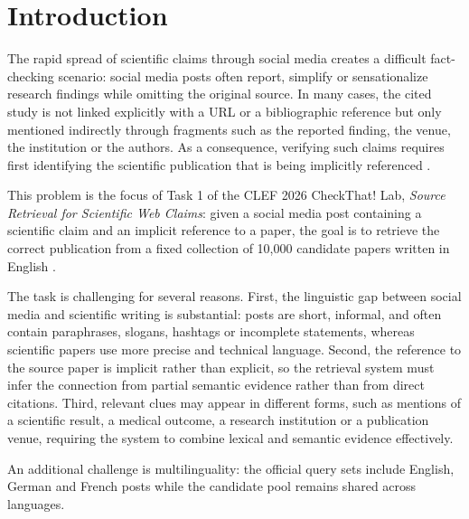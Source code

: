 \section{Introduction}
\label{sec:introduction}

The rapid spread of scientific claims through social media creates a difficult fact-checking scenario: social media posts often report, simplify or sensationalize research findings while omitting the original source. In many cases, the cited study is not linked explicitly with a URL or a bibliographic reference but only mentioned indirectly through fragments such as the reported finding, the venue, the institution or the authors. As a consequence, verifying such claims requires first identifying the scientific publication that is being implicitly referenced \cite{10.1007/978-3-032-21321-1_43}.

This problem is the focus of Task 1 of the CLEF 2026 CheckThat! Lab, \emph{Source Retrieval for Scientific Web Claims}: given a social media post containing a scientific claim and an implicit reference to a paper, the goal is to retrieve the correct publication from a fixed collection of 10,000 candidate papers written in English \cite{clef-checkthat:2026:task1}.

The task is challenging for several reasons. First, the linguistic gap between social media and scientific writing is substantial: posts are short, informal, and often contain paraphrases, slogans, hashtags or incomplete statements, whereas scientific papers use more precise and technical language. Second, the reference to the source paper is implicit rather than explicit, so the retrieval system must infer the connection from partial semantic evidence rather than from direct citations. Third, relevant clues may appear in different forms, such as mentions of a scientific result, a medical outcome, a research institution or a publication venue, requiring the system to combine lexical and semantic evidence effectively.

An additional challenge is multilinguality: the official query sets include English, German and French posts while the candidate pool remains shared across languages.

